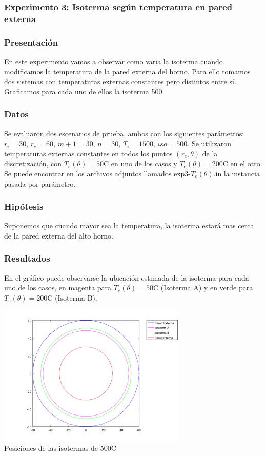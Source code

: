     \subsubsection*{Experimento 3: Isoterma según temperatura en pared externa} 
      
      \subsubsection*{Presentación}
        En este experimento vamos a observar como varía la isoterma cuando modificamos la temperatura de la pared externa del horno. Para ello tomamos dos sistemas con temperaturas externas constantes pero distintos entre sí. Graficamos para cada uno de ellos la isoterma 500. 
      
      \subsubsection*{Datos}
        Se evaluaron dos escenarios de prueba, ambos con los siguientes parámetros: $r_i = 30$, $r_e = 60$, $m+1 = 30$, $n = 30$, $T_i = 1500$, $iso = 500$. Se utilizaron temperaturas externas constantes en todos los puntos $(r_e, \theta)$ de la discretización, con $T_e(\theta) = 50${\degree}C en uno de los casos y $T_e(\theta) = 200${\degree}C en el otro. Se puede encontrar en los archivos adjuntos llamados exp3-$T_e(\theta)$.in la instancia pasada por parámetro.

      \subsubsection*{Hipótesis}
        Suponemos que cuando mayor sea la temperatura, la isoterma estará mas cerca de la pared externa del alto horno. 

      \subsubsection*{Resultados}
        En el gráfico puede observarse la ubicación estimada de la isoterma para cada uno de los casos, en magenta para $T_e(\theta) = 50${\degree}C (Isoterma A) y en verde para $T_e(\theta) = 200${\degree}C (Isoterma B).
        
            \begin{center}
              \includegraphics[width=9cm]{graficos/exp3/exp3.png} \\
              {\small Posiciones de las isotermas de 500{\degree}C}
            \end{center}

